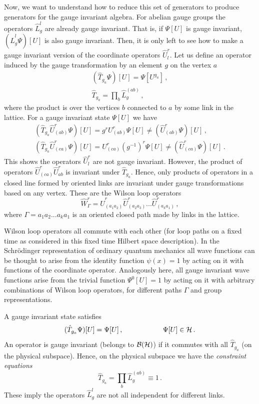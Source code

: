 \documentclass[12pt,a4paper]{article}
\newcommand{\be}{\begin{equation}}
\newcommand{\ee}{\end{equation}}
\newcommand{\bea}{\begin{eqnarray}}
\newcommand{\eea}{\end{eqnarray}}
\def\be{\begin{equation}}
\def\ee{\end{equation}}
\begin{document}
Now, we want to understand how to reduce this set of generators to produce generators for the gauge invariant algebra.  
For abelian gauge groups the operators $\hat{L}^l_g$ are already gauge invariant. That is, if $\Psi[U]$ is gauge invariant, $(\hat{L}_g^l \Psi)[U]$ 
is also gauge invariant. Then, it is only left to see how to make a gauge invariant version of the coordinate operators $\hat{U}^r_l$. 
Let us define an operator induced by the gauge transformation by an element $g$ on the vertex $a$ 
\bea
(\hat{T}_{g_{a}} \Psi)[U]= \Psi[ U^{g_a}]\,,\\
\hat{T}_{g_{a}}=\prod_b \hat{L}_g^{(ab)} \,,
\eea
where the product is over the vertices $b$ connected to $a$ by some link in the lattice.
For a gauge invariant state $\Psi[U]$ we have
\bea
 \left(\hat{T}_{g_a} \hat{U}^{r}_{(ab)}\Psi\right)[U]= g^{r}U^{r}_{(ab)} \Psi[U]\neq \left( \hat{U}^{r}_{(ab)}\Psi\right)[U]\,,\\
\left(\hat{T}_{g_a} \hat{U}^{r}_{(ca)}\Psi\right)[U]= U^{r}_{(ca)} (g^{-1})^{r} \Psi[U]\neq \left( \hat{U}^{r}_{(ca)}\Psi\right)[U]\,.
\eea  
This shows the operators $\hat{U}_l^r$ are not gauge invariant. However, the product of operators $\hat{U}_{(ca)}^{r}\hat{U}_{ab}^{r}$ 
is invariant under $\hat{T}_{g_a}$. Hence, only  products
 of operators in a closed line formed by oriented links are invariant under gauge transformations based on any vertex. These are the 
Wilson loop operators
 \begin{equation}
 \hat{W}^r_\Gamma=\hat{U}^{r}_{(a_1 a_2)}\hat{U}^{r}_{(a_2 a_3)}...\hat{U}^{r}_{(a_k a_1)}\,,
 \end{equation}
 where $\Gamma={a_1 a_2 ... a_k a_1}$ is an oriented closed path made by links in the lattice. 
 
Wilson loop operators all commute with each other (for loop paths on a fixed time as considered in this fixed time Hilbert space description). 
In the Schr\"odinger representation of ordinary quantum mechanics all wave functions can be thought to arise from the identity 
function $\psi(x)=1$ by acting on it with functions of the coordinate operator. Analogously here, all gauge invariant wave functions 
arise from the trivial function $\Psi^0[U]=1$ by acting on it with arbitrary combinations of Wilson loop operators, for different paths $\Gamma$ 
and group representations. 
 
 
A gauge invariant state satisfies
\be
(\hat{T}_{g_{a}} \Psi)[U]=\Psi[U]\,, \hspace{2cm} \Psi[U]\in {\cal H}\,.
\ee
An operator is gauge invariant (belongs to ${\cal B}({\cal H})$) if it commutes with all $\hat{T}_{g_a}$ (on the physical subspace). Hence, 
on the physical subspace we have the {\sl constraint equations}
\be
\hat{T}_{g_a}=\prod_b \hat{L}_g^{(ab)}\equiv 1\,.\label{14}
\ee
These imply the operators $\hat{L}^l_g$ are not all independent for different links. 
\end{document}
